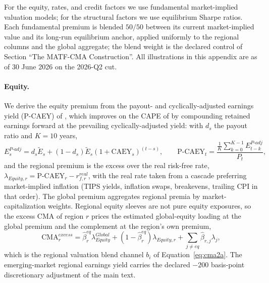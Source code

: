 \documentclass[pdftex,12pt,a4paper]{article}
\begin{document}
For the equity, rates, and credit factors we use fundamental market-implied valuation models; for the structural factors we use equilibrium Sharpe ratios. Each fundamental premium is blended $50/50$ between its current market-implied value and its long-run equilibrium anchor, applied uniformly to the regional columns and the global aggregate; the blend weight is the declared control of Section ``The MATF-CMA Construction''. All illustrations in this appendix are as of 30 June 2026 on the 2026-Q2 cut.

\paragraph*{Equity.} We derive the equity premium from the payout- and cyclically-adjusted earnings yield (P-CAEY) of \cite{HaghaniWhite2024}, which improves on the CAPE of \cite{CampbellShiller1988} by compounding retained earnings forward at the prevailing cyclically-adjusted yield: with $d_s$ the payout ratio and $K=10$ years,
\begin{equation}\label{eq:p_adj}
	E_s^{P\text{-}adj} = d_s \tilde{E}_{s} + (1 - d_s) \tilde{E}_{s} (1 + \text{CAEY}_s)^{(t - s)}, \qquad
	\text{P-CAEY}_t = \frac{\tfrac{1}{K}\sum_{k=0}^{K-1} E_{t-k}^{P\text{-}adj}}{P_t},
\end{equation}
and the regional premium is the excess over the real risk-free rate, $\lambda_{Equity,r} = \text{P-CAEY}_r - r_{f,r}^{real}$, with the real rate taken from a cascade preferring market-implied inflation (TIPS yields, inflation swaps, breakevens, trailing CPI in that order). The global premium aggregates regional premia by market-capitalization weights. Regional equity sleeves are not pure equity exposures, so the excess CMA of region $r$ prices the estimated global-equity loading at the global premium and the complement at the region's own premium,
\begin{equation}\label{eq:regional_cma}
	\text{CMA}_r^{excess} = \hat{\beta}_r^{eq} \lambda_{Equity}^{Global} + (1 - \hat{\beta}_r^{eq}) \lambda_{Equity,r} + \sum_{j \neq eq} \hat{\beta}_{r,j} \lambda_j ,
\end{equation}
which is the regional valuation blend channel $b_i$ of Equation~\eqref{eq:cma2a}. The emerging-market regional earnings yield carries the declared $-200$ basis-point discretionary adjustment of the main text.
\end{document}
